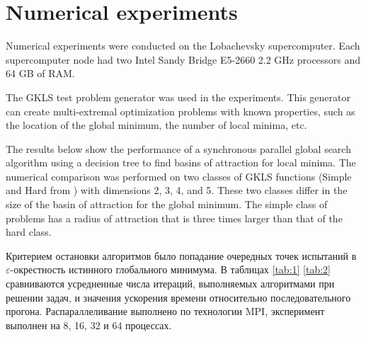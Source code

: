\documentclass[runningheads]{llncs}
\begin{document}
\section{Numerical experiments}\label{SecR}

Numerical experiments were conducted on the Lobachevsky supercomputer. Each supercomputer node had two Intel Sandy Bridge E5-2660 2.2 GHz processors and 64 GB of RAM.

The GKLS test problem generator was used in the experiments. This generator can create multi-extremal optimization problems with known properties, such as the location of the global minimum, the number of local minima, etc.


The results below show the performance of a synchronous parallel global search algorithm using a decision tree to find basins of attraction for local minima. The numerical comparison was performed on two classes of GKLS functions (Simple and Hard from \cite{Sergeyev2006}) with dimensions 2, 3, 4, and 5. These two classes differ in the size of the basin of attraction for the global minimum. The simple class of problems has a radius of attraction that is three times larger than that of the hard class.

Критерием остановки алгоритмов было попадание очередных точек испытаний в $\varepsilon$-окрестность истинного глобального минимума. В таблицах \ref{tab:1} \ref{tab:2} сравниваются усредненные числа итераций, выполняемых алгоритмами при решении задач, и значения ускорения времени относительно последовательного прогона. Распараллеливание выполнено по технологии MPI, эксперимент выполнен на 8, 16, 32 и 64 процессах.
\end{document}
